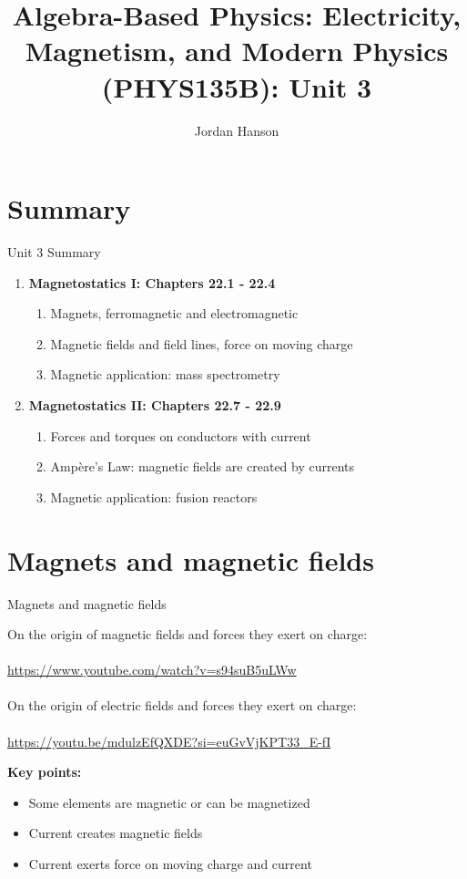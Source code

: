 \documentclass{beamer}
\title{Algebra-Based Physics: Electricity, Magnetism, and Modern Physics (PHYS135B): Unit 3}
\author{Jordan Hanson}
\institute{Whittier College Department of Physics and Astronomy}
\begin{document}
\maketitle

\section{Summary}

\begin{frame}{Unit 3 Summary}
\begin{enumerate}
\item \textbf{Magnetostatics I: Chapters 22.1 - 22.4}
\begin{enumerate}
\item Magnets, ferromagnetic and electromagnetic
\item Magnetic fields and field lines, force on moving charge
\item Magnetic application: \alert{mass spectrometry}
\end{enumerate}
\item \textbf{Magnetostatics II: Chapters 22.7 - 22.9}
\begin{enumerate}
\item Forces and torques on conductors with current
\item Amp\`{e}re's Law: magnetic fields are created by currents
\item Magnetic application: \alert{fusion reactors}
\end{enumerate}
\end{enumerate}
\end{frame}

\section{Magnets and magnetic fields}

\begin{frame}{Magnets and magnetic fields}
\footnotesize
\begin{tcolorbox}[colback=white,colframe=gray,title=Review of the Origin of Electric and Magnetic Fields]
On the origin of magnetic fields and forces they exert on charge:\\ \\
\url{https://www.youtube.com/watch?v=s94suB5uLWw} \\ \\
On the origin of electric fields and forces they exert on charge:\\ \\
\url{https://youtu.be/mdulzEfQXDE?si=euGvVjKPT33_E-fI}
\end{tcolorbox}
\small
\textbf{Key points:}
\begin{itemize}
\item Some elements are magnetic or can be magnetized
\item Current creates magnetic fields
\item Current exerts force on moving charge and current
\end{itemize}
\end{frame}
\end{document}
